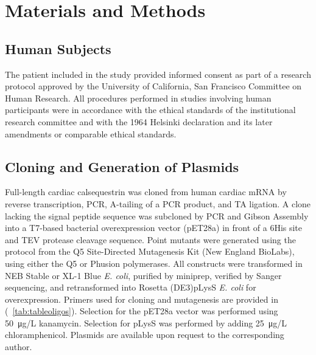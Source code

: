 %
%
\section{Materials and Methods}

\subsection*{Human Subjects}
The patient included in the study provided informed consent as part of a research protocol approved by the University of California, San Francisco Committee on Human Research. All procedures performed in studies involving human participants were in accordance with the ethical standards of the institutional research committee and with the 1964 Helsinki declaration and its later amendments or comparable ethical standards.

\subsection*{Cloning and Generation of Plasmids}
Full-length cardiac calsequestrin was cloned from human cardiac mRNA by reverse transcription, PCR, A-tailing of a PCR product, and TA ligation. A clone lacking the signal peptide sequence was subcloned by PCR and Gibson Assembly into a T7-based bacterial overexpression vector (pET28a) in front of a 6His site and TEV protease cleavage sequence. Point mutants were generated using the protocol from the Q5 Site-Directed Mutagenesis Kit (New England BioLabs), using either the Q5 or Phusion polymerases. All constructs were transformed in NEB Stable or XL-1 Blue \textit{E. coli}, purified by miniprep, verified by Sanger sequencing, and retransformed into Rosetta (DE3)pLysS \textit{E. coli} for overexpression. Primers used for cloning and mutagenesis are provided in (\supplementarytable~\ref{tab:tableoligos}). Selection for the pET28a vector was performed using \SI{50}{\micro\gram/\liter} kanamycin. Selection for pLysS was performed by adding \SI{25}{\micro\gram/\liter} chloramphenicol. Plasmids are available upon request to the corresponding author.

